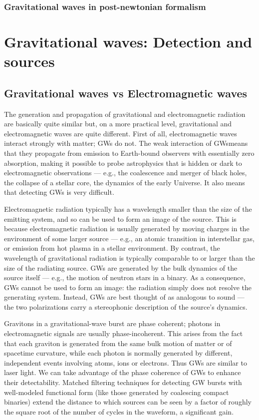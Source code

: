 \documentclass[binding=0.6cm, LaM]{sapthesis}
\begin{document}
\subsection{Gravitational waves in post-newtonian formalism}

\chapter{Gravitational waves: Detection and sources}
\section{Gravitational waves vs Electromagnetic waves}
The generation and propagation of gravitational and electromagnetic radiation are basically quite similar but, on a more practical level, gravitational and electromagnetic waves are quite different.
First of all, electromagnetic waves interact strongly with matter; GWs do not. 
The weak interaction of GWsmeans that they propagate from emission to Earth-bound observers with essentially zero absorption, making it possible to probe astrophysics that is hidden or dark to 
electromagnetic observations — e.g., the coalescence and merger of black holes, the collapse of a stellar core, the dynamics of the early Universe. It also means that detecting GWs is very difficult. 

Electromagnetic radiation typically has a wavelength smaller than the size of the emitting system, and so can be used to form an image of the source.
 This is because electromagnetic radiation is usually generated by moving charges in the environment of some larger source — e.g., an atomic transition in interstellar gas, or emission from hot plasma
 in a stellar environment. By contrast, the wavelength of gravitational radiation is typically comparable to or larger than the size of the radiating source. 
GWs are generated by the bulk dynamics of the source itself — e.g., the motion of neutron stars in a binary. As a consequence, GWs cannot be used to form an image: the radiation simply does not 
resolve the generating system. Instead, GWs are best thought of as analogous to sound — the two polarizations carry a stereophonic description of the source’s dynamics.

Gravitons in a gravitational-wave burst are phase coherent; photons in electromagnetic signals are usually phase-incoherent. This arises from the fact that each graviton is generated from the same 
bulk motion of matter or of spacetime curvature, while each photon is normally generated by different, independent events involving atoms, ions or electrons. 
Thus GWs are similar to laser light. We can take advantage of the phase coherence of GWs to enhance their detectability. Matched filtering techniques for detecting GW bursts with well-modeled 
functional form (like those generated by coalescing compact binaries) extend the distance to which sources can be seen by a factor of roughly the square root of the number of cycles in the waveform, 
a significant gain.
\end{document}
